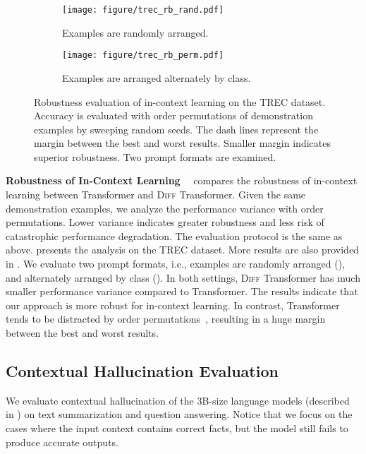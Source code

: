 \documentclass{article}
\newcommand{\mypara}[1]{\textbf{#1}~~}
\newcommand\diff{\textsc{Diff} Transformer}
\newcommand\trm{Transformer}
\begin{document}
\begin{figure}[t]
\vspace{-1.0em}
\centering
\begin{subfigure}{0.49\textwidth}
\texttt{[image: figure/trec\_rb\_rand.pdf]}
\caption{Examples are randomly arranged.}
\label{fig:icl-robust-rand}
\end{subfigure}
\hfill
\begin{subfigure}{0.49\textwidth}
\texttt{[image: figure/trec\_rb\_perm.pdf]}
\caption{Examples are arranged alternately by class.}
\label{fig:icl-robust-perm}
\end{subfigure}
\caption{Robustness evaluation of in-context learning on the TREC dataset.
Accuracy is evaluated with order permutations of demonstration examples by sweeping random seeds.
The dash lines represent the margin between the best and worst results.
Smaller margin indicates superior robustness.
Two prompt formats are examined.
}
\label{fig:icl-robust}
\end{figure}


\mypara{Robustness of In-Context Learning}
 compares the robustness of in-context learning between Transformer and \diff{}.
Given the same demonstration examples, we analyze the performance variance with order permutations.
Lower variance indicates greater robustness and less risk of catastrophic performance degradation.
The evaluation protocol is the same as above.
 presents the analysis on the TREC dataset.
More results are also provided in .
We evaluate two prompt formats, i.e., examples are randomly arranged (), and alternately arranged by class ().
In both settings, \diff{} has much smaller performance variance compared to \trm{}.
The results indicate that our approach is more robust for in-context learning.
In contrast, \trm{} tends to be distracted by order permutations~\citep{icl:order:sensit}, resulting in a huge margin between the best and worst results.


\subsection{Contextual Hallucination Evaluation}
\label{sec:hallu}

We evaluate contextual hallucination of the 3B-size language models (described in ) on text summarization and question answering.
Notice that we focus on the cases where the input context contains correct facts, but the model still fails to produce accurate outputs.
\end{document}
